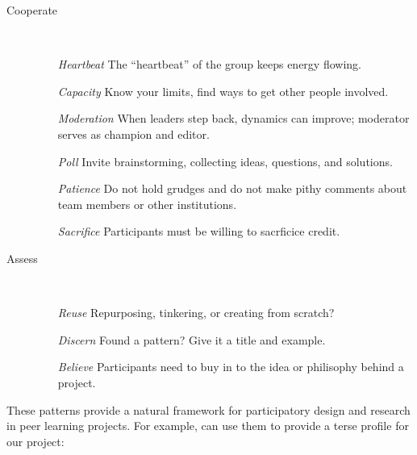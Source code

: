 \documentclass{acm_proc_article-sp}
\begin{document}
\hspace{.2in}
\begin{minipage}{.4\textwidth}
\begin{description}
\item[Cooperate] \quad \\[-.1in]
\begin{itemize}
\item[\emph{Heartbeat}] The ``heartbeat'' of the group keeps energy flowing.
\item[\emph{Capacity}] Know your limits, find ways to get other people
  involved.
\item[\emph{Moderation}] When leaders step back, dynamics can improve;
  moderator serves as champion and editor.
\item[\emph{Poll}] Invite brainstorming, collecting ideas, questions, and
  solutions.
\item[\emph{Patience}] Do not hold grudges and do not make pithy comments
  about team members or other institutions.
\item[\emph{Sacrifice}] Participants must be willing to sacrficice credit.
\end{itemize}
\end{description}
\end{minipage}

\hspace{.2in}
\begin{minipage}{.4\textwidth}
\begin{description}
\item[Assess]  \quad \\[-.1in]
\begin{itemize}
\item[\emph{Reuse}] Repurposing, tinkering, or creating from scratch?
\item[\emph{Discern}] Found a pattern? Give it a title and example.
\item[\emph{Believe}] Participants need to buy in to the idea or philisophy
  behind a project.
\end{itemize}
\end{description}
\end{minipage}

These patterns provide a natural framework for participatory design
and research in peer learning projects.  For example, can use them to
provide a terse profile for our project:
\end{document}
